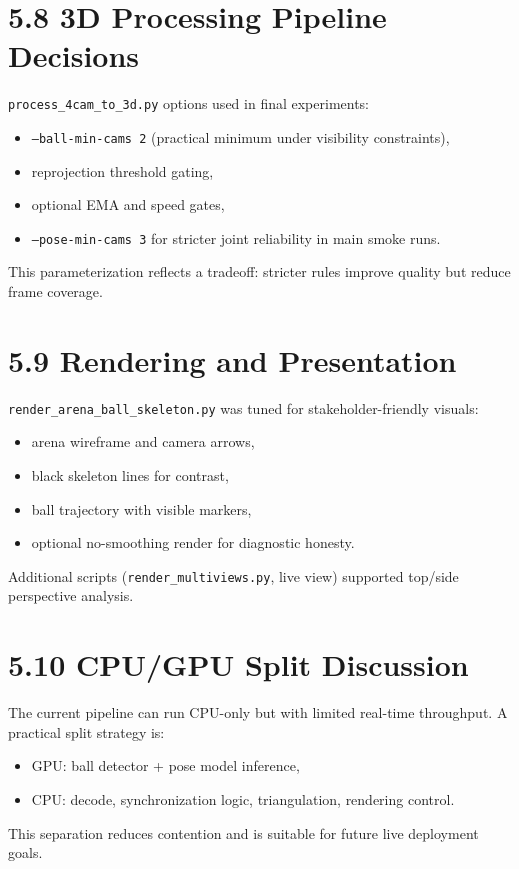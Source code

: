 \section{5.8 3D Processing Pipeline Decisions}
\texttt{process\_4cam\_to\_3d.py} options used in final experiments:
\begin{itemize}
  \item \texttt{--ball-min-cams 2} (practical minimum under visibility constraints),
  \item reprojection threshold gating,
  \item optional EMA and speed gates,
  \item \texttt{--pose-min-cams 3} for stricter joint reliability in main smoke runs.
\end{itemize}

This parameterization reflects a tradeoff: stricter rules improve quality but reduce frame coverage.

\section{5.9 Rendering and Presentation}
\texttt{render\_arena\_ball\_skeleton.py} was tuned for stakeholder-friendly visuals:
\begin{itemize}
  \item arena wireframe and camera arrows,
  \item black skeleton lines for contrast,
  \item ball trajectory with visible markers,
  \item optional no-smoothing render for diagnostic honesty.
\end{itemize}

Additional scripts (\texttt{render\_multiviews.py}, live view) supported top/side perspective analysis.

\section{5.10 CPU/GPU Split Discussion}
The current pipeline can run CPU-only but with limited real-time throughput. A practical split strategy is:
\begin{itemize}
  \item GPU: ball detector + pose model inference,
  \item CPU: decode, synchronization logic, triangulation, rendering control.
\end{itemize}

This separation reduces contention and is suitable for future live deployment goals.


